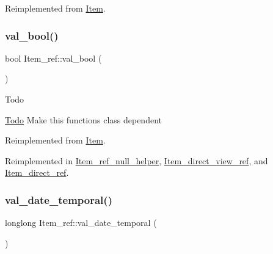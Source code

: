 Reimplemented from \mbox{\hyperlink{classItem_ae4459c9d19c2c656c63da3bbd32760e5}{Item}}.

\mbox{\label{classItem__ref_af6730f5fe99b99c653a6fa1a66e8cf89}} 
\subsubsection{\texorpdfstring{val\+\_\+bool()}{val\_bool()}}
{\footnotesize\ttfamily bool Item\+\_\+ref\+::val\+\_\+bool (\begin{DoxyParamCaption}{ }\end{DoxyParamCaption})\hspace{0.3cm}{\ttfamily [virtual]}}

\begin{DoxyRefDesc}{Todo}
\item[\mbox{\hyperlink{todo__todo000026}{Todo}}]Make this functions class dependent \end{DoxyRefDesc}


Reimplemented from \mbox{\hyperlink{classItem_a875594d2b9d99ccff3863bfd435828f0}{Item}}.



Reimplemented in \mbox{\hyperlink{classItem__ref__null__helper_ae2f622d4bb13a40800c5293c07f56334}{Item\+\_\+ref\+\_\+null\+\_\+helper}}, \mbox{\hyperlink{classItem__direct__view__ref_addadee858f933ad08e2bb3bb533067f3}{Item\+\_\+direct\+\_\+view\+\_\+ref}}, and \mbox{\hyperlink{classItem__direct__ref_ae552bb7da0a5629c75850d6d0e07d344}{Item\+\_\+direct\+\_\+ref}}.

\mbox{\label{classItem__ref_a749f7427b60d23f3f50a6651dcc3abf6}} 
\subsubsection{\texorpdfstring{val\+\_\+date\+\_\+temporal()}{val\_date\_temporal()}}
{\footnotesize\ttfamily longlong Item\+\_\+ref\+::val\+\_\+date\+\_\+temporal (\begin{DoxyParamCaption}{ }\end{DoxyParamCaption})\hspace{0.3cm}{\ttfamily [virtual]}}

